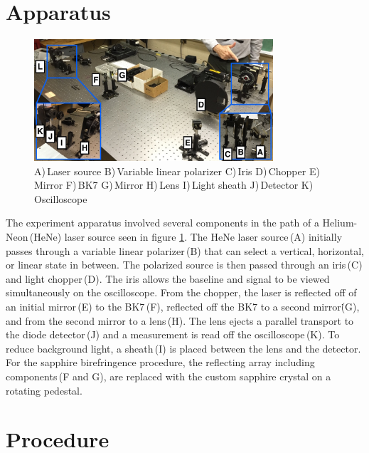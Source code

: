 \documentclass[aps,prl,twocolumn,superscriptaddress,nofootinbib]{revtex4-1}
\begin{document}


\section{Apparatus}


\begin{figure}[h!]
  \begin{center}
\centerline{\includegraphics[width=3.5in]{apparatus.jpg}}
\caption{\small{A)\,Laser source B)\,Variable linear polarizer C)\,Iris D)\,Chopper E)\,Mirror F)\,BK7 G)\,Mirror H)\,Lens I)\,Light sheath J)\,Detector K)\,Oscilloscope \label{app1}}}
  \end{center}
\end{figure}
\vspace{-.7cm}
\vfill\eject
The experiment apparatus involved several components in the path of a Helium-Neon\,(HeNe) laser source seen in figure \ref{app1}. The HeNe laser source\,(A) initially passes through a variable linear polarizer\,(B) that can select a vertical, horizontal, or linear state in between. The polarized source is then passed through an iris\,(C) and light chopper\,(D). The iris allows the baseline and signal to be viewed simultaneously on the oscilloscope. From the chopper, the laser is reflected off of an initial mirror\,(E) to the BK7\,(F), reflected off the BK7 to a second mirror\.(G), and from the second mirror to a lens\,(H). The lens ejects a parallel transport to the diode detector\,(J) and a measurement is read off the oscilloscope\,(K). To reduce background light, a sheath\,(I) is placed between the lens and the detector. For the sapphire birefringence procedure, the reflecting array including components\,(F and G), are replaced with the custom sapphire crystal on a rotating pedestal.



\section{Procedure}
\end{document}
